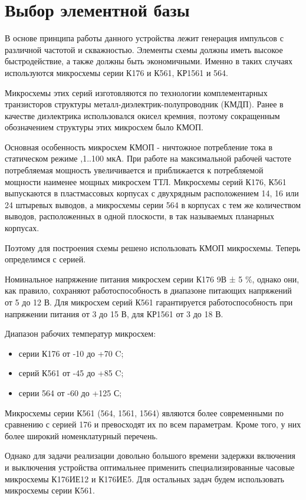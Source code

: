 \section{Выбор элементной базы}

В основе принципа работы данного устройства лежит генерация импульсов с различной частотой и скважностью. Элементы схемы должны иметь высокое быстродействие, а также должны быть экономичными. Именно в таких случаях используются микросхемы серии К176 и К561, КР1561 и 564.

Микросхемы этих серий изготовляются по технологии комплементарных транзисторов структуры металл-диэлектрик-полупроводник (КМДП). Ранее в качестве диэлектрика использовался окисел кремния, поэтому сокращенным обозначением структуры этих микросхем было КМОП.

Основная особенность микросхем КМОП - ничтожное потребление тока в статическом режиме ,1..100 мкА. При работе на максимальной рабочей частоте потребляемая мощность увеличивается и приближается к потребляемой мощности наименее мощных микросхем ТТЛ. Микросхемы серий К176, К561 выпускаются в пластмассовых корпусах с двухрядным расположением 14, 16 или 24 штыревых выводов, а микросхемы серии 564 \longndash в корпусах с тем же количеством выводов, расположенных в одной плоскости, в так называемых планарных корпусах. 

Поэтому для построения схемы решено использовать КМОП микросхемы. Теперь определимся с серией.

Номинальное напряжение питания микросхем серии К176 \longndash 9В ± 5 \%, однако они, как правило, сохраняют работоспособность в диапазоне питающих напряжений от 5 до 12 В. Для микросхем серий К561 гарантируется работоспособность при напряжении питания от 3 до 15 В, для КР1561 \longndash от 3 до 18 В.

Диапазон рабочих температур микросхем:
\begin{itemize}
	\item серии К176 от -10 до +70 C;
	\item серий К561 от -45 до +85 C;
	\item серии 564 от -60 до +125 С;
\end{itemize}

Микросхемы серии К561 (564, 1561, 1564) являются более современными по сравнению с серией 176 и превосходят их по всем параметрам. Кроме того, у них более широкий номенклатурный перечень.

Однако для задачи реализации довольно большого времени задержки включения и выключения устройства оптимальнее применить специализированные часовые микросхемы К176ИЕ12 и К176ИЕ5. Для остальных задач будем использовать микросхемы серии К561.

